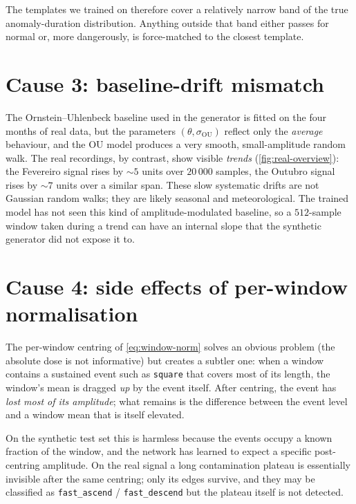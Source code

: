 The templates we trained on therefore cover a relatively narrow band
of the true anomaly-duration distribution. Anything outside that band
either passes for normal or, more dangerously, is force-matched to the
closest template.

\section{Cause 3: baseline-drift mismatch}
\label{sec:fail-drift}

The Ornstein--Uhlenbeck baseline used in the generator is fitted on
the four months of real data, but the parameters
$(\theta, \sigma_{\mathrm{OU}})$ reflect only the
\emph{average} behaviour, and the OU model produces a very smooth,
small-amplitude random walk. The real recordings, by contrast, show
visible \emph{trends} (\cref{fig:real-overview}): the Fevereiro signal
rises by $\sim 5$ units over $20\,000$ samples, the Outubro signal
rises by $\sim 7$ units over a similar span. These slow systematic
drifts are not Gaussian random walks; they are likely seasonal and
meteorological. The trained model has not seen this kind of
amplitude-modulated baseline, so a $512$-sample window taken during a
trend can have an internal slope that the synthetic generator did not
expose it to.

\section{Cause 4: side effects of per-window normalisation}
\label{sec:fail-norm}

The per-window centring of \cref{eq:window-norm} solves an obvious
problem (the absolute dose is not informative) but creates a subtler
one: when a window contains a sustained event such as \texttt{square}
that covers most of its length, the window's mean is dragged \emph{up}
by the event itself. After centring, the event has \emph{lost most of
its amplitude}; what remains is the difference between the event level
and a window mean that is itself elevated.

On the synthetic test set this is harmless because the events occupy a
known fraction of the window, and the network has learned to expect a
specific post-centring amplitude. On the real signal a long
contamination plateau is essentially invisible after the same
centring; only its edges survive, and they may be classified as
\texttt{fast\_ascend} / \texttt{fast\_descend} but the plateau itself
is not detected.

